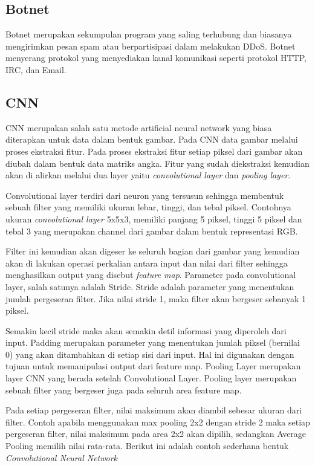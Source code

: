 \documentclass[./skripsi.tex]{subfiles}
\begin{document}
\subsection{Botnet}
\par Botnet merupakan sekumpulan program yang saling terhubung dan biasanya mengirimkan pesan spam atau berpartisipasi dalam melakukan DDoS. Botnet menyerang protokol yang menyediakan kanal komunikasi seperti protokol HTTP, IRC, dan Email.
\subsection{CNN}\label{bab2:cnn}
\par CNN merupakan salah satu metode artificial neural network yang biasa diterapkan untuk data dalam bentuk gambar. Pada CNN data gambar melalui proses ekstraksi fitur. Pada proses ekstraksi fitur setiap piksel dari gambar akan diubah dalam bentuk data matriks angka. Fitur yang sudah diekstraksi kemudian akan di alirkan melalui dua layer yaitu \textit{convolutional layer} dan \textit{pooling layer}.
\par Convolutional layer terdiri dari neuron yang tersusun sehingga membentuk sebuah filter yang memiliki ukuran lebar, tinggi, dan tebal piksel. Contohnya ukuran \textit{convolutional layer} 5x5x3, memiliki panjang 5 piksel, tinggi 5 piksel dan tebal 3 yang merupakan channel dari gambar dalam bentuk representasi RGB.
\par Filter ini kemudian akan digeser ke seluruh bagian dari gambar yang kemudian akan di lakukan operasi perkalian antara input dan nilai dari filter sehingga menghasilkan output yang disebut \textit{feature map}. Parameter pada convolutional layer, salah satunya adalah Stride. Stride adalah parameter yang menentukan jumlah pergeseran filter. Jika nilai stride 1, maka filter akan bergeser sebanyak 1 piksel.
\par Semakin kecil stride maka akan semakin detil informasi yang diperoleh dari input. Padding merupakan parameter yang menentukan jumlah piksel (bernilai 0) yang akan ditambahkan di setiap sisi dari input. Hal ini digunakan dengan tujuan untuk memanipulasi output dari feature map. Pooling Layer merupakan layer CNN yang berada setelah Convolutional Layer. Pooling layer merupakan sebuah filter yang bergeser juga pada seluruh area feature map.
\par Pada setiap pergeseran filter, nilai maksimum akan diambil sebesar ukuran dari filter. Contoh apabila menggunakan max pooling 2x2 dengan stride 2
maka setiap pergeseran filter, nilai maksimum pada area 2x2 akan dipilih, sedangkan Average Pooling memilih nilai rata-rata. Berikut ini adalah contoh sederhana bentuk \textit{Convolutional Neural Network}
\end{document}
